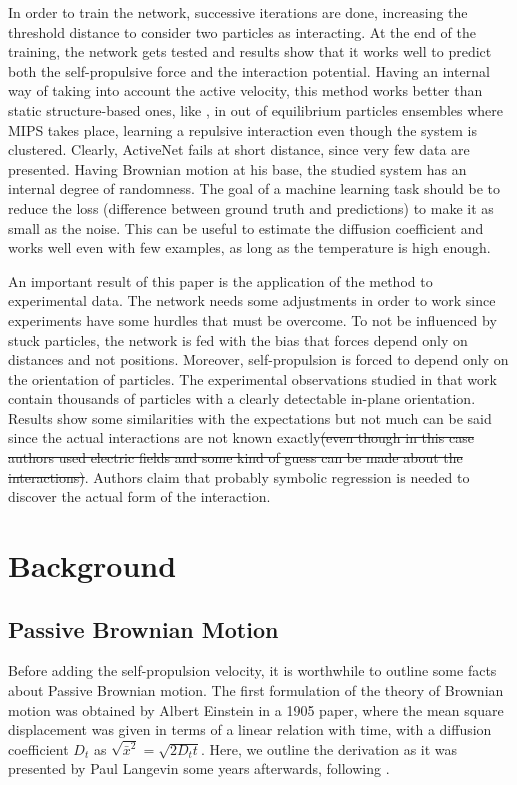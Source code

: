 \documentclass[../../master_thesis_np.tex]{subfiles}
\begin{document}
	In order to train the network, successive iterations are done, increasing the threshold distance to consider two particles as interacting. 
	At the end of the training, the network gets tested and results show that it works well to predict both the self-propulsive force and the interaction potential. 
	Having an internal way of taking into account the active velocity, this method works better than static structure-based ones, like \cite{bag_interaction_2021}, in out of equilibrium particles ensembles where MIPS takes place, learning a repulsive interaction even though the system is clustered. 
	Clearly, ActiveNet fails at short distance, since very few data are presented. 
	Having Brownian motion at his base, the studied system has an internal degree of randomness. 
	The goal of a machine learning task should be to reduce the loss (difference between ground truth and predictions) to make it as small as the noise. 
	This can be useful to estimate the diffusion coefficient and works well even with few examples, as long as the temperature is high enough. 
	
	An important result of this paper is the application of the method to experimental data. 
	The network needs some adjustments in order to work since experiments have some hurdles that must be overcome. 
	To not be influenced by stuck particles, the network is fed with the bias that forces depend only on distances and not positions. 
	Moreover, self-propulsion is forced to depend only on the orientation of particles. 
	The experimental observations studied in that work contain thousands of particles with a clearly detectable in-plane orientation. 
	Results show some similarities with the expectations but not much can be said since the actual interactions are not known exactly\sout{(even though in this case authors used electric fields and some kind of guess can be made about the interactions)}. 
	Authors claim that probably symbolic regression is needed to discover the actual form of the interaction.
	
	\section{Background}
	\subsection{Passive Brownian Motion}

	Before adding the self-propulsion velocity, it is worthwhile to outline some facts about Passive Brownian motion.
	The first formulation of the theory of Brownian motion was obtained by Albert Einstein in a 1905 paper, where the mean square displacement was given in terms of a linear relation with time, with a diffusion coefficient $D_t$ as $\sqrt{\bar{x}^2} = \sqrt{2D_t t}$. 
	Here, we outline the derivation as it was presented by Paul Langevin some years afterwards, following \cite{gardiner_handbook_2004}.
	
\end{document}
